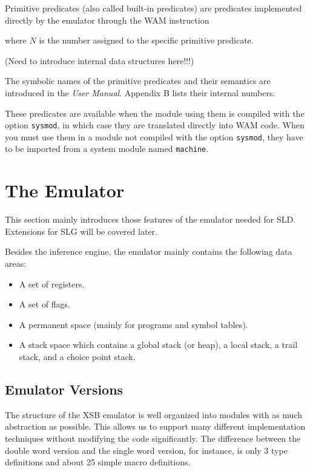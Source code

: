 \documentclass[11pt]{article}
\newcommand{\demo}[1]{\hspace*{1.5cm}{\sf #1}}
\begin{document}
Primitive predicates (also called built-in predicates)
are predicates implemented directly by the emulator through the
WAM instruction 

\demo{		builtin(N)			}

where $N$ is the number assigned to the specific primitive predicate.

(Need to introduce internal data structures here!!!)

The symbolic names of the primitive predicates and their semantics
are introduced in the {\it User Manual}. Appendix B lists
their internal numbers.

These predicates are available when the module using them is compiled
with the option {\tt sysmod}, in which case they are translated
directly into WAM code. When you must use them in a module not compiled
with the option {\tt sysmod}, they have to be imported from a system 
module named {\tt machine}.




\section                 {The Emulator}

This section mainly introduces those features of the emulator needed for
SLD.  Extensions for SLG will be covered later.

Besides the inference engine, the emulator mainly contains the following
data areas:

\begin{itemize}
  \item  A set of registers.
  \item  A set of flags.
  \item  A permanent space (mainly for programs and symbol tables).
  \item  A stack space which contains a global stack (or heap), a local stack,
     a trail stack, and a choice point stack.
\end{itemize}

\subsection{Emulator Versions}

The structure of the XSB emulator is well organized into 
modules with as much abstraction as possible. This allows us to support
many different implementation techniques without modifying the code
significantly. The difference between the double word version
and the single word version, for instance, is only 3 type definitions
and about 25 simple macro definitions.
\end{document}
